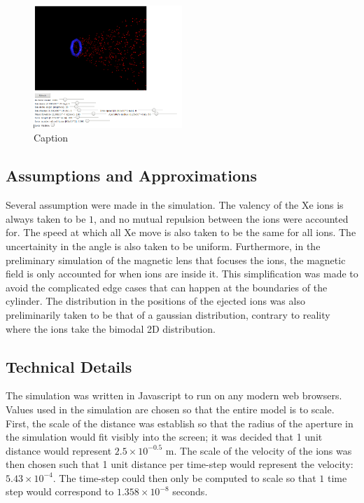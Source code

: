 \documentclass[twocolumn,12pt]{article}
\numberwithin{equation}{section} %
\numberwithin{equation}{section}
\begin{document}
\begin{figure}[H]
    \centering
    \includegraphics[width=0.5\textwidth]{results/scren.png}
    \caption{Caption}
    \label{fig:my_label}
\end{figure}

\subsection{Assumptions and Approximations}

Several assumption were made in the simulation. The valency of the Xe ions is always taken to be $1$, and no mutual repulsion between the ions were accounted for. The speed at which all Xe move is also taken to be the same for all ions. The uncertainity in the angle is also taken to be uniform. Furthermore, in the preliminary simulation of the magnetic lens that focuses the ions, the magnetic field is only accounted for when ions are inside it. This simplification was made to avoid the complicated edge cases that can happen at the boundaries of the cylinder. The distribution in the positions of the ejected ions was also preliminarily taken to be that of a gaussian distribution, contrary to reality where the ions take the bimodal 2D distribution. 

\subsection{Technical Details}
The simulation was written in Javascript to run on any modern web browsers. Values used in the simulation are chosen so that the entire model is to scale. First, the scale of the distance was establish so that the radius of the aperture in the simulation would fit visibly into the screen; it was decided that 1 unit distance would represent $2.5\times 10^{-0.5}$ m. The scale of the velocity of the ions was then chosen such that 1 unit distance per time-step would represent the velocity: $5.43 \times 10^{-4}$. The time-step could then only be computed to scale so that $1$ time step would correspond to $1.358 \times 10^{-8}$ seconds. 
\end{document}
